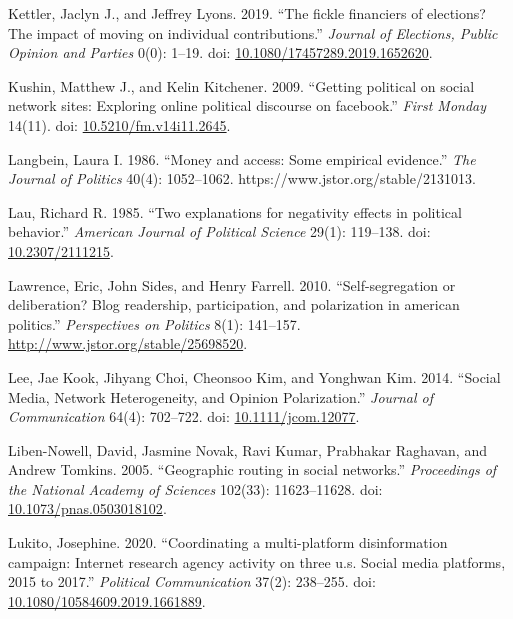 \documentclass[12pt,]{article}
\newlength{\cslhangindent}
\newenvironment{CSLReferences}%
    {\setlength{\parindent}{0pt}%
    \everypar{\setlength{\hangindent}{\cslhangindent}}\ignorespaces}%
    {\par}
\begin{document}
\begin{CSLReferences}{1}{0}
\leavevmode{}%
Kettler, Jaclyn J., and Jeffrey Lyons. 2019. {``The fickle financiers of
elections? The impact of moving on individual contributions.''}
\emph{Journal of Elections, Public Opinion and Parties} 0(0): 1--19.
doi:
\href{https://doi.org/10.1080/17457289.2019.1652620}{10.1080/17457289.2019.1652620}.

\leavevmode{}%
Kushin, Matthew J., and Kelin Kitchener. 2009. {``Getting political on
social network sites: Exploring online political discourse on
facebook.''} \emph{First Monday} 14(11). doi:
\href{https://doi.org/10.5210/fm.v14i11.2645}{10.5210/fm.v14i11.2645}.

\leavevmode{}%
Langbein, Laura I. 1986. {``Money and access: Some empirical
evidence.''} \emph{The Journal of Politics} 40(4): 1052--1062.
https://www.jstor.org/stable/2131013.

\leavevmode{}%
Lau, Richard R. 1985. {``Two explanations for negativity effects in
political behavior.''} \emph{American Journal of Political Science}
29(1): 119--138. doi:
\href{https://doi.org/10.2307/2111215}{10.2307/2111215}.

\leavevmode{}%
Lawrence, Eric, John Sides, and Henry Farrell. 2010. {``Self-segregation
or deliberation? Blog readership, participation, and polarization in
american politics.''} \emph{Perspectives on Politics} 8(1): 141--157.
\url{http://www.jstor.org/stable/25698520}.

\leavevmode{}%
Lee, Jae Kook, Jihyang Choi, Cheonsoo Kim, and Yonghwan Kim. 2014.
{``{Social Media, Network Heterogeneity, and Opinion Polarization}.''}
\emph{Journal of Communication} 64(4): 702--722. doi:
\href{https://doi.org/10.1111/jcom.12077}{10.1111/jcom.12077}.

\leavevmode{}%
Liben-Nowell, David, Jasmine Novak, Ravi Kumar, Prabhakar Raghavan, and
Andrew Tomkins. 2005. {``Geographic routing in social networks.''}
\emph{Proceedings of the National Academy of Sciences} 102(33):
11623--11628. doi:
\href{https://doi.org/10.1073/pnas.0503018102}{10.1073/pnas.0503018102}.

\leavevmode{}%
Lukito, Josephine. 2020. {``Coordinating a multi-platform disinformation
campaign: Internet research agency activity on three u.s. Social media
platforms, 2015 to 2017.''} \emph{Political Communication} 37(2):
238--255. doi:
\href{https://doi.org/10.1080/10584609.2019.1661889}{10.1080/10584609.2019.1661889}.


\end{CSLReferences}
\end{document}
